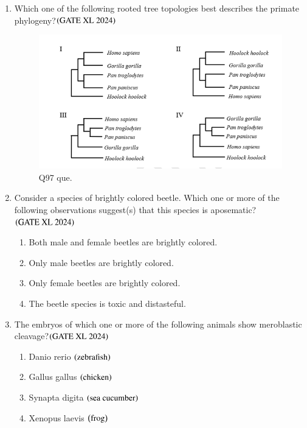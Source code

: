 \documentclass[journal]{IEEEtran}
\begin{document}
\begin{enumerate}
    \item Which one of the following rooted tree topologies best describes the primate phylogeny?\hfill $\left(\text{GATE XL 2024}\right)$
    \begin{figure}[H]
        \centering
        \includegraphics[width=0.8\columnwidth]{figs/xl2024_q97_que.png}
        \caption{Q97 que.}
    \end{figure}
    \begin{enumerate}
    \end{enumerate}

    \item Consider a species of brightly colored beetle. Which one or more of the following observations suggest(s) that this species is aposematic?\hfill $\left(\text{GATE XL 2024}\right)$
    \begin{enumerate}
        \item Both male and female beetles are brightly colored.
        \item Only male beetles are brightly colored.
        \item Only female beetles are brightly colored.
        \item The beetle species is toxic and distasteful.
    \end{enumerate}

    \item The embryos of which one or more of the following animals show meroblastic cleavage?\hfill $\left(\text{GATE XL 2024}\right)$
    \begin{enumerate}
            \item Danio rerio $\left(\text{zebrafish}\right)$
            \item Gallus gallus $\left(\text{chicken}\right)$
            \item Synapta digita $\left(\text{sea cucumber}\right)$
            \item Xenopus laevis $\left(\text{frog}\right)$
    \end{enumerate}


\end{enumerate}
\end{document}
